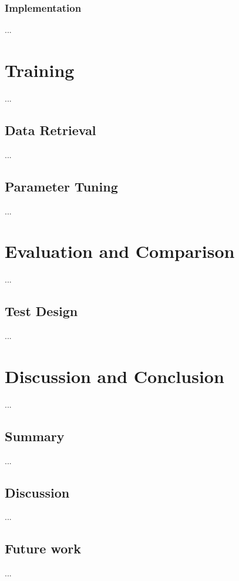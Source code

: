 \subsection{Implementation}\label{c.postagging.rnn.implementation}
...

\chapter{Training}\label{c.training}
...

\section{Data Retrieval}\label{c.training.data}
...

\section{Parameter Tuning}\label{c.training.tuning}
...

\chapter{Evaluation and Comparison}\label{c.evaluation}
...

\section{Test Design}\label{c.evaluation.test}
...

\chapter{Discussion and Conclusion}\label{c.conclusion}
...

\section{Summary}\label{c.conclusion.summary}
...

\section{Discussion}\label{c.conclusion.discussion}
...

\section{Future work}\label{c.conclusion.future}
...

